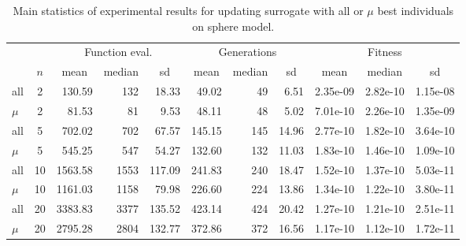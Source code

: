 \documentclass[10pt, conference]{IEEEtran} %
\begin{document}
\begin{table}[t!] 
\centering
{\renewcommand{\arraystretch}{1.1} \renewcommand{\tabcolsep}{0.04cm} \scriptsize%
\begin{tabularx}{0.99\columnwidth}{| X | c | rrr | rrr| rrr |}
\hline
 & & \multicolumn{3}{c|}{Function eval.} & \multicolumn{3}{c|}{Generations} & \multicolumn{3}{c|}{Fitness} \\ 
     & $n$ & \multicolumn{1}{|c}{mean} & \multicolumn{1}{c}{median} & \multicolumn{1}{c|}{sd} & \multicolumn{1}{|c}{mean} & \multicolumn{1}{c}{median} & \multicolumn{1}{c|}{sd} & \multicolumn{1}{|c}{mean} & \multicolumn{1}{c}{median} & \multicolumn{1}{c|}{sd} \\
\hline
all& 2 & 130.59 & 132 & 18.33 & 49.02 & 49 & 6.51 & 2.35e-09 & 2.82e-10 & 1.15e-08\\ 
$\mu$&2 & 81.53 & 81 & 9.53 & 48.11 & 48 & 5.02 & 7.01e-10 & 2.26e-10 & 1.35e-09\\ \hline
all& 5 & 702.02 & 702 & 67.57 & 145.15 & 145 & 14.96 & 2.77e-10 & 1.82e-10 & 3.64e-10\\ 
$\mu$& 5 & 545.25 & 547 & 54.27 & 132.60 & 132 & 11.03 & 1.83e-10 & 1.46e-10 & 1.09e-10\\ \hline
all& 10 & 1563.58 & 1553 & 117.09 & 241.83 & 240 & 18.47 & 1.52e-10 & 1.37e-10 & 5.03e-11\\ 
$\mu$& 10 & 1161.03 & 1158 & 79.98 & 226.60 & 224 & 13.86 & 1.34e-10 & 1.22e-10 & 3.80e-11\\ \hline
all& 20 & 3383.83 & 3377 & 135.52 & 423.14 & 424 & 20.42 & 1.27e-10 & 1.21e-10 & 2.51e-11\\ 
$\mu$& 20 & 2795.28 & 2804 & 132.77 & 372.86 & 372 & 16.56 & 1.17e-10 & 1.12e-10 & 1.72e-11\\ \hline
\end{tabularx}
}
\caption{Main statistics of experimental results for updating surrogate with all or $\mu$ best individuals on sphere model.}\label{tbl:Sphere}
\end{table}
\end{document}
